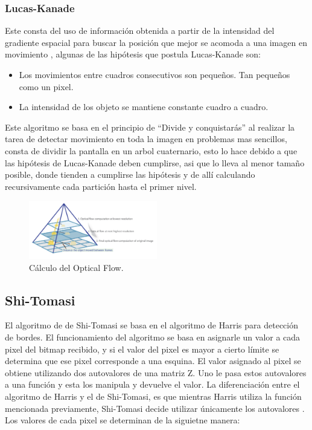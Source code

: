 \subsubsection{Lucas-Kanade} 
 Este consta del uso de información obtenida a partir de la intensidad del gradiente espacial para buscar la posición que mejor se acomoda a una imagen en movimiento \cite{ref:lucas-kanade} \cite{ref:lucas-kanade2}, algunas de las hipótesis que postula Lucas-Kanade son:
\begin{itemize}
\item Los movimientos entre cuadros consecutivos son pequeños. Tan pequeños como un pixel.
\item La intensidad de los objeto se mantiene constante cuadro a cuadro.
\end{itemize} 
Este algoritmo se basa en el principio de ``Divide y conquistarás'' al realizar la tarea de detectar movimiento en toda la imagen en problemas mas sencillos, consta de dividir la pantalla en un arbol cuaternario, esto lo hace debido a que las hipótesis de Lucas-Kanade deben cumplirse, asi que lo lleva al menor tamaño posible, donde tienden a cumplirse las hipótesis y de allí calculando recursivamente  cada partición hasta el primer nivel.
\begin{figure}[H]
		\centering
		\includegraphics[width=0.5\textwidth]{Imagenes/op.png}
		\caption{Cálculo del Optical Flow.}
		\label{fig:opticalflow1}
\end{figure}
\subsection{Shi-Tomasi}
El algoritmo de de Shi-Tomasi se basa en el algoritmo de Harris para detección de bordes. El funcionamiento del algoritmo se basa en asignarle un valor a cada pixel del bitmap recibido, y si el valor del pixel es mayor a cierto límite se determina que ese pixel corresponde a una esquina. El valor asignado al pixel se obtiene utilizando dos autovalores de una matriz Z. Uno le pasa estos autovalores a una función y esta los manipula y devuelve el valor.
La diferenciación entre el algoritmo de Harris y el de Shi-Tomasi, es que mientras Harris utiliza la función mencionada previamente, Shi-Tomasi decide utilizar únicamente los autovalores \cite{ref:shi-tomasi}.
\\ Los valores de cada pixel se determinan de la siguietne manera:

